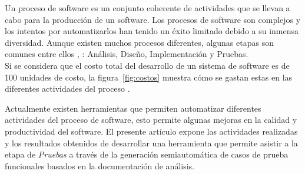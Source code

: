 Un proceso de software es un conjunto coherente de actividades que se llevan a cabo para la producción de un software. Los procesos de software son complejos y los intentos por automatizarlos han tenido un éxito limitado debido a su inmensa diversidad. Aunque existen muchos procesos diferentes, algunas etapas son comunes entre ellos \cite{sommerville1992software}, \cite{pressman2005software}: Análisis, Diseño, Implementación y Pruebas.\\

Si se considera que el costo total del desarrollo de un sistema de software es de 100 unidades de costo, la figura~\ref{fig:costos}  muestra cómo se gastan estas en las diferentes actividades del proceso \cite{sommerville1992software}. \\


Actualmente existen herramientas que permiten automatizar diferentes actividades del proceso de software, esto permite algunas mejoras en la calidad y productividad del software. El presente artículo expone las actividades realizadas y los resultados obtenidos de desarrollar una herramienta que permite asistir a la etapa de {\it Pruebas} a través de la generación semiautomática de casos de prueba funcionales basados en la documentación de análisis.